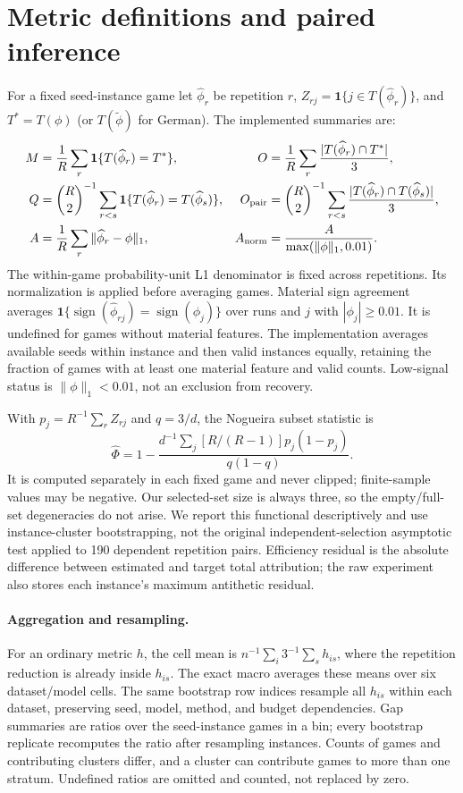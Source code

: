 \documentclass{article}
\newcommand{\ind}{\mathbf{1}}
\begin{document}
\section{Metric definitions and paired inference}
\label{app:metrics}
For a fixed seed-instance game let $\widehat\phi_r$ be repetition $r$, $Z_{rj}=\ind\{j\in T(\widehat\phi_r)\}$, and $T^*=T(\phi)$ (or $T(\widetilde\phi)$ for German). The implemented summaries are:
\begin{align}
 M&=\frac1R\sum_r\ind\{T(\widehat\phi_r)=T^*\}, &
 O&=\frac1R\sum_r\frac{|T(\widehat\phi_r)\cap T^*|}{3},\\
 Q&=\binom R2^{-1}\sum_{r<s}\ind\{T(\widehat\phi_r)=T(\widehat\phi_s)\}, &
 O_{\rm pair}&=\binom R2^{-1}\sum_{r<s}\frac{|T(\widehat\phi_r)\cap T(\widehat\phi_s)|}{3},\\
 A&=\frac1R\sum_r\|\widehat\phi_r-\phi\|_1, &
 A_{\rm norm}&=\frac{A}{\max(\|\phi\|_1,0.01)}.
\end{align}
The within-game probability-unit L1 denominator is fixed across repetitions. Its normalization is applied before averaging games. Material sign agreement averages $\ind\{\operatorname{sign}(\widehat\phi_{rj})=\operatorname{sign}(\phi_j)\}$ over runs and $j$ with $|\phi_j|\geq0.01$. It is undefined for games without material features. The implementation averages available seeds within instance and then valid instances equally, retaining the fraction of games with at least one material feature and valid counts. Low-signal status is $\|\phi\|_1<0.01$, not an exclusion from recovery.

With $p_j=R^{-1}\sum_rZ_{rj}$ and $q=3/d$, the Nogueira subset statistic is
\begin{equation}
 \widehat\Phi=1-\frac{d^{-1}\sum_j[R/(R-1)]p_j(1-p_j)}{q(1-q)}.
\end{equation}
It is computed separately in each fixed game and never clipped; finite-sample values may be negative. Our selected-set size is always three, so the empty/full-set degeneracies do not arise. We report this functional descriptively and use instance-cluster bootstrapping, not the original independent-selection asymptotic test applied to 190 dependent repetition pairs. Efficiency residual is the absolute difference between estimated and target total attribution; the raw experiment also stores each instance's maximum antithetic residual.

\paragraph{Aggregation and resampling.}
For an ordinary metric $h$, the cell mean is $n^{-1}\sum_i3^{-1}\sum_s h_{is}$, where the repetition reduction is already inside $h_{is}$. The exact macro averages these means over six dataset/model cells. The same bootstrap row indices resample all $h_{is}$ within each dataset, preserving seed, model, method, and budget dependencies. Gap summaries are ratios over the seed-instance games in a bin; every bootstrap replicate recomputes the ratio after resampling instances. Counts of games and contributing clusters differ, and a cluster can contribute games to more than one stratum. Undefined ratios are omitted and counted, not replaced by zero.
\end{document}
